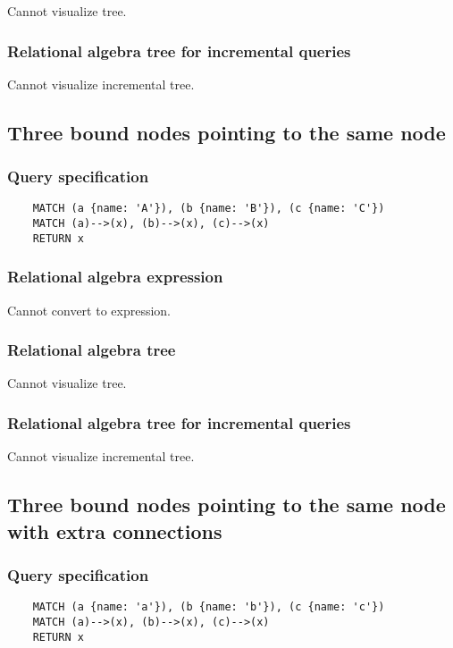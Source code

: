 	Cannot visualize tree.

	\subsubsection*{Relational algebra tree for incremental queries}

	Cannot visualize incremental tree.
	\subsection{Three bound nodes pointing to the same node}

	\subsubsection*{Query specification}

	\begin{lstlisting}
	MATCH (a {name: 'A'}), (b {name: 'B'}), (c {name: 'C'})
	MATCH (a)-->(x), (b)-->(x), (c)-->(x)
	RETURN x
	\end{lstlisting}


	\subsubsection*{Relational algebra expression}

	Cannot convert to expression.

	\subsubsection*{Relational algebra tree}

	Cannot visualize tree.

	\subsubsection*{Relational algebra tree for incremental queries}

	Cannot visualize incremental tree.
	\subsection{Three bound nodes pointing to the same node with extra connections}

	\subsubsection*{Query specification}

	\begin{lstlisting}
	MATCH (a {name: 'a'}), (b {name: 'b'}), (c {name: 'c'})
	MATCH (a)-->(x), (b)-->(x), (c)-->(x)
	RETURN x
	\end{lstlisting}


